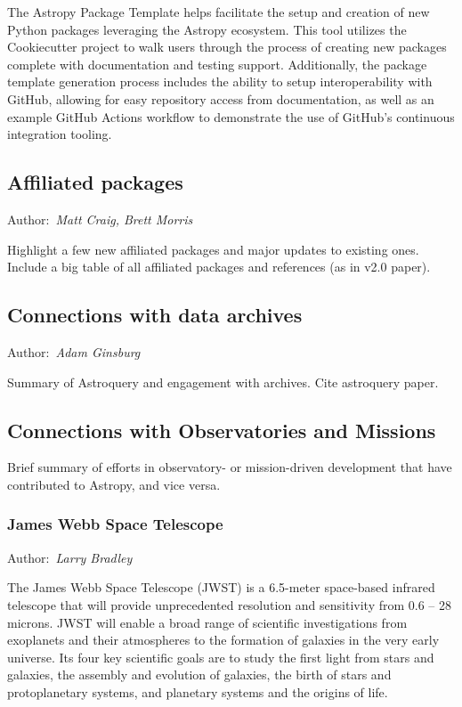 \documentclass[modern]{aastex631}
\newcommand{\secauthor}[1]{{\color{blue}Author:~\textit{#1}}}
\begin{document}
The Astropy Package Template helps facilitate the setup and creation of new
Python packages leveraging the Astropy ecosystem. This tool utilizes the
Cookiecutter project to walk users through the process of creating new
packages complete with documentation and testing support. Additionally, the
package template generation process includes the ability to setup
interoperability with GitHub, allowing for easy repository access from
documentation, as well as an example GitHub Actions workflow to demonstrate
the use of GitHub's continuous integration tooling.

\subsection{Affiliated packages}

\secauthor{Matt Craig, Brett Morris}

Highlight a few new affiliated packages and major updates to existing ones.
Include a big table of all affiliated packages and references (as in v2.0
paper).

\subsection{Connections with data archives}

\secauthor{Adam Ginsburg}

Summary of Astroquery and engagement with archives. Cite astroquery paper.

\subsection{Connections with Observatories and Missions}

Brief summary of efforts in observatory- or mission-driven development that have
contributed to Astropy, and vice versa.

\subsubsection{James Webb Space Telescope}
\secauthor{Larry Bradley}

The James Webb Space Telescope (JWST) is a 6.5-meter space-based
infrared telescope that will provide unprecedented resolution and
sensitivity from 0.6 -- 28 microns. JWST will enable a broad range
of scientific investigations from exoplanets and their atmospheres
to the formation of galaxies in the very early universe. Its four
key scientific goals are to study the first light from stars and
galaxies, the assembly and evolution of galaxies, the birth of stars and
protoplanetary systems, and planetary systems and the origins of life.
\end{document}
